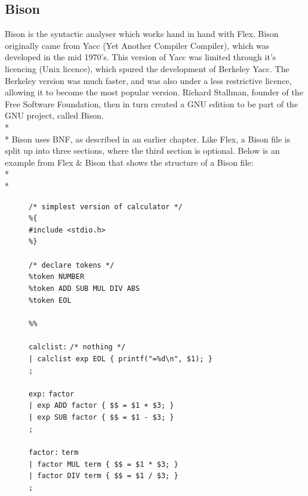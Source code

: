 \documentclass[12pt]{report}
\begin{document}
\subsection{Bison}\label{subsec:bison}
Bison is the syntactic analyser which works hand in hand with Flex.  Bison originally came from Yacc (Yet Another Compiler Compiler), which was developed in the mid 1970's.  This version of Yacc was limited through it's licencing (Unix licence), which spured the development of Berkeley Yacc.  The Berkeley version was much faster, and was also under a less restrictive licence, allowing it to become the most popular version.  Richard Stallman, founder of the Free Software Foundation, then in turn created a GNU edition to be part of the GNU project, called Bison.\\*
\\*
Bison uses BNF, as described in an earlier chapter.  Like Flex, a Bison file is split up into three sections, where the third section is optional.  Below is an example from Flex \& Bison that shows the structure of a Bison file:\\*
\\*
\begin{figure}[H]
	\begin{tabbing}
	\texttt{/* simplest version of calculator */}\\
	\texttt{\%\{}\\
	\texttt{\#include <stdio.h>}\\
	\texttt{\%\}}\\
	\\
	\texttt{/* declare tokens */}\\
	\texttt{\%token NUMBER}\\
	\texttt{\%token ADD SUB MUL DIV ABS}\\
	\texttt{\%token EOL}\\
	\\
	\texttt{\%\%}\\
	\\
	\texttt{calclist:} \= \texttt{/* nothing */}\\
	\> \texttt{| calclist exp EOL \{ printf("=\%d\textbackslash n", \$1); \}}\\
	\> \texttt{;}\\
	\\
	\texttt{exp:} \= \texttt{factor}\\
	\> \texttt{| exp ADD factor \{ \$\$ = \$1 + \$3; \}}\\
	\> \texttt{| exp SUB factor \{ \$\$ = \$1 - \$3; \}}\\
	\> \texttt{;}\\
	\\
	\texttt{factor:} \= \texttt{term}\\
	\> \texttt{| factor MUL term \{ \$\$ = \$1 * \$3; \}}\\
	\> \texttt{| factor DIV term \{ \$\$ = \$1 / \$3; \}}\\
	\> \texttt{;}
	\end{tabbing}
	\end{figure}
\end{document}
